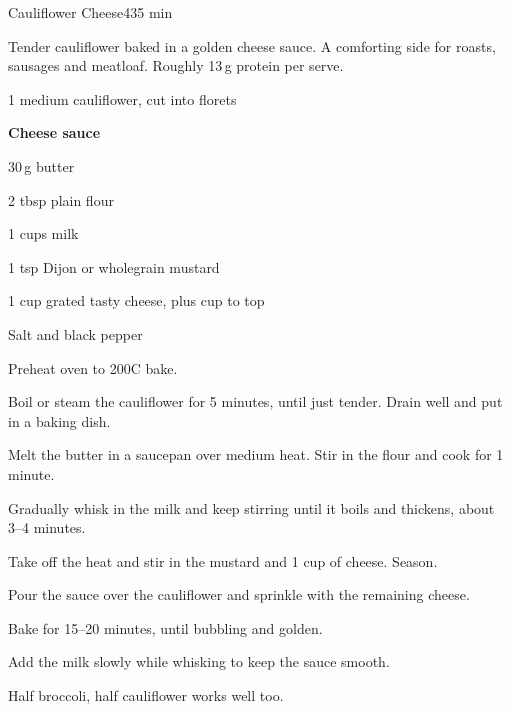 \begin{recipebox}{Cauliflower Cheese}{4}{35 min}

Tender cauliflower baked in a golden cheese sauce. A comforting side for roasts,
sausages and meatloaf. Roughly 13\,g protein per serve.

\begin{ingredients}
  \item 1 medium cauliflower, cut into florets
  \item[] \textbf{Cheese sauce}
  \item 30\,g butter
  \item 2 tbsp plain flour
  \item 1 cups milk
  \item 1 tsp Dijon or wholegrain mustard
  \item 1 cup grated tasty cheese, plus  cup to top
  \item Salt and black pepper
\end{ingredients}

\begin{method}
  \item Preheat oven to 200\degree C bake.
  \item Boil or steam the cauliflower for 5 minutes, until just tender. Drain well and put in a baking dish.
  \item Melt the butter in a saucepan over medium heat. Stir in the flour and cook for 1 minute.
  \item Gradually whisk in the milk and keep stirring until it boils and thickens, about 3--4 minutes.
  \item Take off the heat and stir in the mustard and 1 cup of cheese. Season.
  \item Pour the sauce over the cauliflower and sprinkle with the remaining cheese.
  \item Bake for 15--20 minutes, until bubbling and golden.
\end{method}

\begin{notelist}
  \item Add the milk slowly while whisking to keep the sauce smooth.
  \item Half broccoli, half cauliflower works well too.
\end{notelist}

\end{recipebox}
